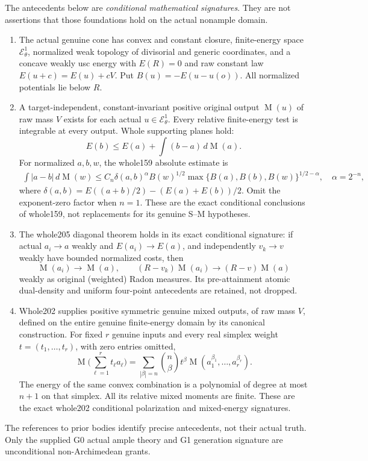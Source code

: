 \documentclass[11pt]{article}
\newcommand{\EE}{\mathcal E^1_\theta}
\newcommand{\MA}{\operatorname{M}}
\begin{document}
The antecedents below are \emph{conditional mathematical
signatures}. They are not assertions that those foundations
hold on the actual nonample domain.
\begin{enumerate}
\item The actual genuine cone has convex and constant closure,
finite-energy space $\EE$, normalized weak topology of
divisorial and generic coordinates, and a concave weakly usc
energy with $E(R)=0$ and raw constant law $E(u+c)=E(u)+cV$.
Put $B(u)=-E(u-u(o))$. All normalized potentials lie below $R$.
\item A target-independent, constant-invariant positive original output $\MA(u)$
of raw mass $V$ exists for each actual $u\in\EE$.
Every relative finite-energy test is integrable at every
output. Whole supporting planes hold:
\[
 E(b)\leq E(a)+\int(b-a)\,d\MA(a).                       \tag{1}
\]
For normalized $a,b,w$, the whole159 absolute estimate is
\[
\begin{split}
 \int|a-b|\,d\MA(w)
 \leq C_n\delta(a,b)^\alpha B(w)^{1/2}
     \max\{B(a),B(b),B(w)\}^{1/2-\alpha},\quad
 \alpha=2^{-n},
\end{split}                                             \tag{2}
\]
where $\delta(a,b)=E((a+b)/2)-(E(a)+E(b))/2$.
Omit the exponent-zero factor when $n=1$.
These are the exact conditional conclusions of whole159,
not replacements for its genuine S--M hypotheses.
\item The whole205 diagonal theorem holds in its exact
conditional signature: if actual $a_i\to a$ weakly and
$E(a_i)\to E(a)$, and independently $v_k\to v$ weakly
have bounded normalized costs, then
\[
 \MA(a_i)\to\MA(a),\qquad
 (R-v_k)\MA(a_i)\to(R-v)\MA(a)                            \tag{3}
\]
weakly as original (weighted) Radon measures.
Its pre-attainment atomic dual-density and uniform
four-point antecedents are retained, not dropped.
\item Whole202 supplies positive symmetric genuine mixed
outputs, of raw mass $V$, defined on the entire genuine
finite-energy domain by its canonical construction.
For fixed $r$ genuine inputs and every real simplex
weight $t=(t_1,\ldots,t_r)$, with zero entries omitted,
\[
 \MA\Big(\sum_{\ell=1}^r t_\ell a_\ell\Big)
   =\sum_{|\beta|=n}\binom n\beta t^\beta
                        \MA(a_1^{\beta_1},\ldots,a_r^{\beta_r}).
                                                               \tag{4}
\]
The energy of the same convex combination is a polynomial
of degree at most $n+1$ on that simplex. All its relative
mixed moments are finite. These are the exact whole202
conditional polarization and mixed-energy signatures.
\end{enumerate}
The references to prior bodies identify precise antecedents,
not their actual truth. Only the supplied G0 actual ample
theory and G1 generation signature are unconditional
non-Archimedean grants.
\end{document}

